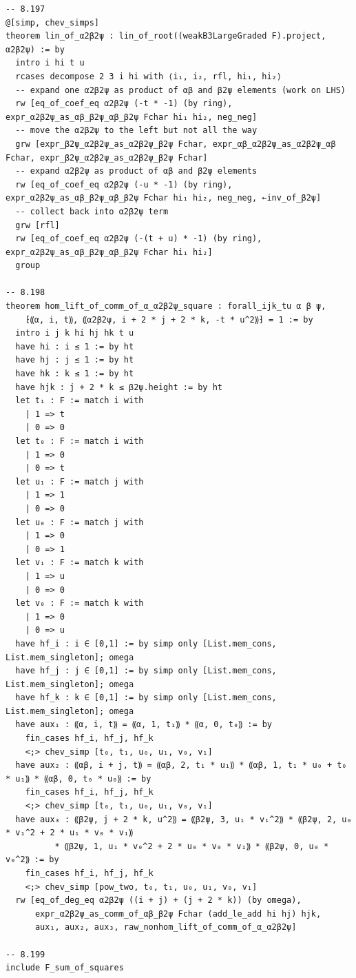 \begin{Verbatim}
-- 8.197
@[simp, chev_simps]
theorem lin_of_α2β2ψ : lin_of_root((weakB3LargeGraded F).project, α2β2ψ) := by
  intro i hi t u
  rcases decompose 2 3 i hi with ⟨i₁, i₂, rfl, hi₁, hi₂⟩
  -- expand one α2β2ψ as product of αβ and β2ψ elements (work on LHS)
  rw [eq_of_coef_eq α2β2ψ (-t * -1) (by ring), expr_α2β2ψ_as_αβ_β2ψ_αβ_β2ψ Fchar hi₁ hi₂, neg_neg]
  -- move the α2β2ψ to the left but not all the way
  grw [expr_β2ψ_α2β2ψ_as_α2β2ψ_β2ψ Fchar, expr_αβ_α2β2ψ_as_α2β2ψ_αβ Fchar, expr_β2ψ_α2β2ψ_as_α2β2ψ_β2ψ Fchar]
  -- expand α2β2ψ as product of αβ and β2ψ elements
  rw [eq_of_coef_eq α2β2ψ (-u * -1) (by ring), expr_α2β2ψ_as_αβ_β2ψ_αβ_β2ψ Fchar hi₁ hi₂, neg_neg, ←inv_of_β2ψ]
  -- collect back into α2β2ψ term
  grw [rfl]
  rw [eq_of_coef_eq α2β2ψ (-(t + u) * -1) (by ring), expr_α2β2ψ_as_αβ_β2ψ_αβ_β2ψ Fchar hi₁ hi₂]
  group

-- 8.198
theorem hom_lift_of_comm_of_α_α2β2ψ_square : forall_ijk_tu α β ψ,
    ⁅⸨α, i, t⸩, ⸨α2β2ψ, i + 2 * j + 2 * k, -t * u^2⸩⁆ = 1 := by
  intro i j k hi hj hk t u
  have hi : i ≤ 1 := by ht
  have hj : j ≤ 1 := by ht
  have hk : k ≤ 1 := by ht
  have hjk : j + 2 * k ≤ β2ψ.height := by ht
  let t₁ : F := match i with
    | 1 => t
    | 0 => 0
  let t₀ : F := match i with
    | 1 => 0
    | 0 => t
  let u₁ : F := match j with
    | 1 => 1
    | 0 => 0
  let u₀ : F := match j with
    | 1 => 0
    | 0 => 1
  let v₁ : F := match k with
    | 1 => u
    | 0 => 0
  let v₀ : F := match k with
    | 1 => 0
    | 0 => u
  have hf_i : i ∈ [0,1] := by simp only [List.mem_cons, List.mem_singleton]; omega
  have hf_j : j ∈ [0,1] := by simp only [List.mem_cons, List.mem_singleton]; omega
  have hf_k : k ∈ [0,1] := by simp only [List.mem_cons, List.mem_singleton]; omega
  have aux₁ : ⸨α, i, t⸩ = ⸨α, 1, t₁⸩ * ⸨α, 0, t₀⸩ := by
    fin_cases hf_i, hf_j, hf_k
    <;> chev_simp [t₀, t₁, u₀, u₁, v₀, v₁]
  have aux₂ : ⸨αβ, i + j, t⸩ = ⸨αβ, 2, t₁ * u₁⸩ * ⸨αβ, 1, t₁ * u₀ + t₀ * u₁⸩ * ⸨αβ, 0, t₀ * u₀⸩ := by
    fin_cases hf_i, hf_j, hf_k
    <;> chev_simp [t₀, t₁, u₀, u₁, v₀, v₁]
  have aux₃ : ⸨β2ψ, j + 2 * k, u^2⸩ = ⸨β2ψ, 3, u₁ * v₁^2⸩ * ⸨β2ψ, 2, u₀ * v₁^2 + 2 * u₁ * v₀ * v₁⸩
          * ⸨β2ψ, 1, u₁ * v₀^2 + 2 * u₀ * v₀ * v₁⸩ * ⸨β2ψ, 0, u₀ * v₀^2⸩ := by
    fin_cases hf_i, hf_j, hf_k
    <;> chev_simp [pow_two, t₀, t₁, u₀, u₁, v₀, v₁]
  rw [eq_of_deg_eq α2β2ψ ((i + j) + (j + 2 * k)) (by omega),
      expr_α2β2ψ_as_comm_of_αβ_β2ψ Fchar (add_le_add hi hj) hjk,
      aux₁, aux₂, aux₃, raw_nonhom_lift_of_comm_of_α_α2β2ψ]

-- 8.199
include F_sum_of_squares


\end{Verbatim}
